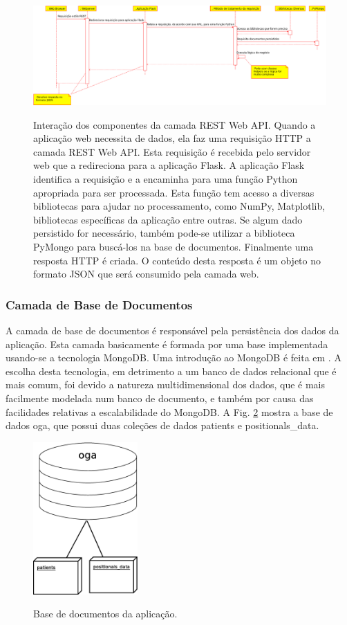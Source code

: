 \documentclass[journal]{IEEEtran}
\begin{document}
\begin{figure}[tb]
	\centering
	{\includegraphics[width=\textwidth]{camada_api}}
	\caption{Interação dos componentes da camada REST Web API. Quando a aplicação web necessita de dados, ela faz uma requisição HTTP a camada REST Web API. Esta requisição é recebida pelo servidor web que a redireciona para a aplicação Flask. A aplicação Flask identifica a requisição e a encaminha para uma função Python apropriada para ser processada. Esta função tem acesso a diversas bibliotecas para ajudar no processamento, como NumPy, Matplotlib, bibliotecas específicas da aplicação entre outras.  Se algum dado persistido for necessário, também pode-se utilizar a biblioteca PyMongo para buscá-los na base de documentos. Finalmente uma resposta HTTP é criada. O conteúdo desta resposta é um objeto no formato JSON que será consumido pela camada web.}
	\label{camada_api}
\end{figure}

\subsubsection{Camada de Base de Documentos}

A camada de base de documentos é responsável pela persistência dos dados da aplicação.
Esta camada basicamente é formada por uma base implementada usando-se a tecnologia
MongoDB. Uma introdução ao MongoDB é feita em \cite{Plugge2014}.
A escolha desta tecnologia, em detrimento a um banco de dados relacional que é mais comum,
foi devido a natureza multidimensional dos dados, que é mais facilmente modelada num
banco de documento, e também por causa das facilidades relativas a escalabilidade do 
MongoDB.
A Fig. \ref{mongo_oga} mostra a base de dados oga, que possui duas coleções de dados 
patients e positionals\_data.

\begin{figure}[!t]
	\centering
	{\includegraphics[width=4cm]{mongo_oga}}
	\caption{Base de documentos da aplicação. }
	\label{mongo_oga}
\end{figure}
\end{document}
